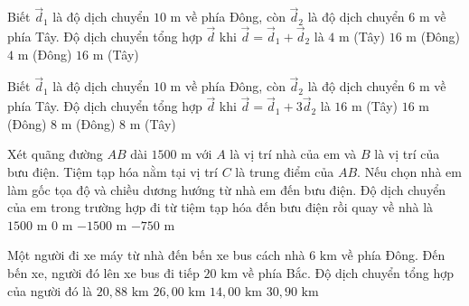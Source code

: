 \begin{vd} Biết $\vec{d}_1$ là độ dịch chuyển $10\text{ m}$ về phía Đông, còn $\vec{d}_2$ là độ dịch chuyển $6\text{ m}$ về phía Tây. Độ dịch chuyển tổng hợp $\vec{d}$ khi $\vec{d} = \vec{d}_1 + \vec{d}_2$ là
\choice
{$4\text{ m}$ (Tây)}
{$16\text{ m}$ (Đông)}
{\True $4\text{ m}$ (Đông)}
{$16\text{ m}$ (Tây)}
\end{vd}

\begin{vd} Biết $\vec{d}_1$ là độ dịch chuyển $10\text{ m}$ về phía Đông, còn $\vec{d}_2$ là độ dịch chuyển $6\text{ m}$ về phía Tây. Độ dịch chuyển tổng hợp $\vec{d}$ khi $\vec{d} = \vec{d}_1 + 3\vec{d}_2$ là
\choice
{$16\text{ m}$ (Tây)}
{$16\text{ m}$ (Đông)}
{$8\text{ m}$ (Đông)}
{\True $8\text{ m}$ (Tây)}
\end{vd}

\begin{vd} Xét quãng đường $AB$ dài $1500\text{ m}$ với $A$ là vị trí nhà của em và $B$ là vị trí của bưu điện. Tiệm tạp hóa nằm tại vị trí $C$ là trung điểm của $AB$. Nếu chọn nhà em làm gốc tọa độ và chiều dương hướng từ nhà em đến bưu điện. Độ dịch chuyển của em trong trường hợp đi từ tiệm tạp hóa đến bưu điện rồi quay về nhà là
\choice
{$1500\text{ m}$}
{$0\text{ m}$}
{$-1500\text{ m}$}
{\True $-750\text{ m}$}
\end{vd}

\begin{vd} Một người đi xe máy từ nhà đến bến xe bus cách nhà $6\text{ km}$ về phía Đông. Đến bến xe, người đó lên xe bus đi tiếp $20\text{ km}$ về phía Bắc. Độ dịch chuyển tổng hợp của người đó là
\choice
{\True $20{,}88\text{ km}$}
{$26{,}00\text{ km}$}
{$14{,}00\text{ km}$}
{$30{,}90\text{ km}$}
\end{vd}

